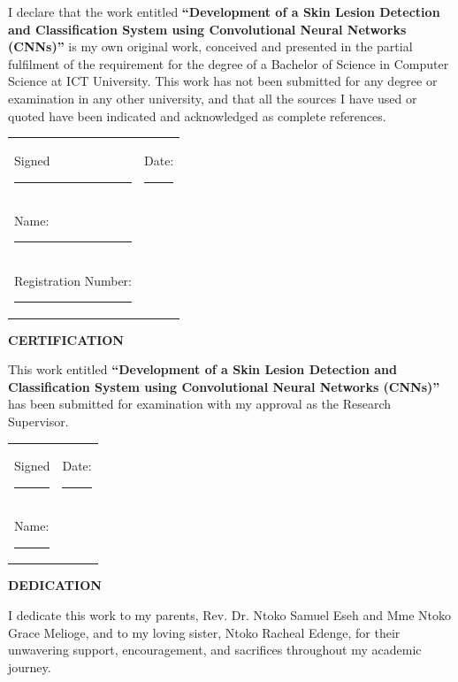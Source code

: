 \vspace{1cm}

I declare that the work entitled \textbf{``Development of a Skin Lesion Detection and Classification System using Convolutional Neural Networks (CNNs)''} is my own original work, conceived and presented in the partial fulfilment of the requirement for the degree of a Bachelor of Science in Computer Science at ICT University. This work has not been submitted for any degree or examination in any other university, and that all the sources I have used or quoted have been indicated and acknowledged as complete references.

\vspace{1.2cm}

\begin{tabular}{ll}
Signed \rule{4cm}{0.15mm} \hspace{3cm} & Date: \rule{4cm}{0.15mm} \\ [0.5cm]
Name: \rule{4cm}{0.15mm} & \\ [0.5cm]
Registration Number: \rule{4cm}{0.15mm} & \\
\end{tabular}
\vfill
\clearpage
\thispagestyle{empty}
\begin{center}
\textbf{\large CERTIFICATION}
\end{center}

\vspace{1cm}

This work entitled \textbf{``Development of a Skin Lesion Detection and Classification System using Convolutional Neural Networks (CNNs)''} has been submitted for examination with my approval as the Research Supervisor.

\vspace{2cm}

\begin{tabular}{ll}
Signed \rule{4cm}{0.15mm} \hspace{3cm} & Date: \rule{4cm}{0.15mm} \\ [0.5cm]
Name: \rule{4cm}{0.15mm} & \\
\end{tabular}
\clearpage

\thispagestyle{empty}
\begin{center}
\textbf{\large DEDICATION}
\end{center}

\vspace{2cm} %

I dedicate this work to my parents, Rev. Dr. Ntoko Samuel Eseh and Mme Ntoko Grace Melioge, and to my loving sister, Ntoko Racheal Edenge, for their unwavering support, encouragement, and sacrifices throughout my academic journey.

